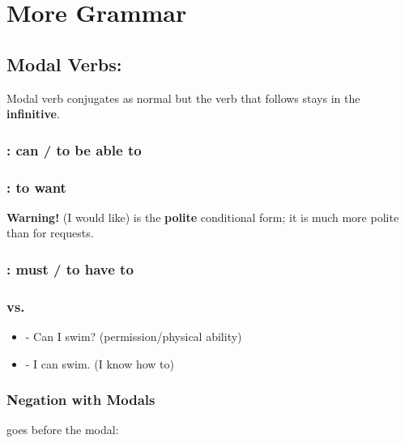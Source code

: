 \part{More Grammar} \label{M5-MoreGrammar}

\chapter{Modal Verbs: }

Modal verb conjugates as normal but the verb that follows stays in the \textbf{infinitive}.

\section{: can / to be able to}

\section{: to want}

\textbf{Warning!}  (I would like) is the \textbf{polite} conditional form; it is much more polite than  for requests.

\section{: must / to have to}

\section{ vs. }
\begin{itemize}[nosep]
    \item {} - Can I swim? (permission/physical ability)
    \item {} - I can swim. (I know how to)
\end{itemize}

\section{Negation with Modals}
 goes before the modal: 

